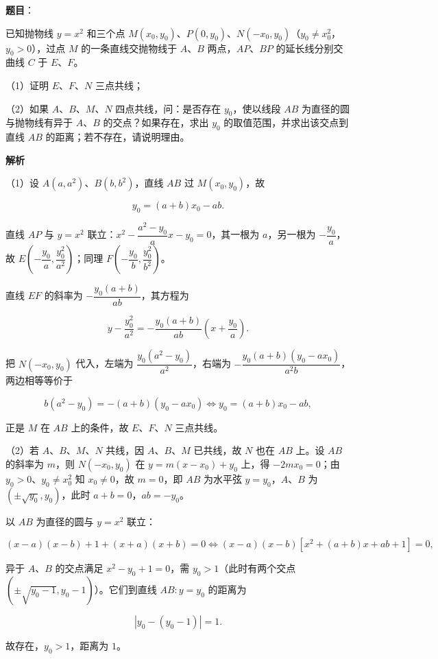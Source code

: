 \begin{answer}

\textbf{题目}：

已知抛物线 $y=x^2$ 和三个点 $M(x_0,y_0)$、$P(0,y_0)$、$N(-x_0,y_0)$（$y_0\neq x_0^2$，$y_0>0$），过点 $M$ 的一条直线交抛物线于 $A$、$B$ 两点，$AP$、$BP$ 的延长线分别交曲线 $C$ 于 $E$、$F$。

（1）证明 $E$、$F$、$N$ 三点共线；

（2）如果 $A$、$B$、$M$、$N$ 四点共线，问：是否存在 $y_0$，使以线段 $AB$ 为直径的圆与抛物线有异于 $A$、$B$ 的交点？如果存在，求出 $y_0$ 的取值范围，并求出该交点到直线 $AB$ 的距离；若不存在，请说明理由。
\nopagebreak[4]
\begin{center}\end{center}
\nopagebreak[4]
\textbf{解析}

（1）设 $A(a,a^2)$、$B(b,b^2)$，直线 $AB$ 过 $M(x_0,y_0)$，故

\nopagebreak[4]
\[y_0=(a+b)x_0-ab.\]

直线 $AP$ 与 $y=x^2$ 联立：$x^2-\dfrac{a^2-y_0}{a}x-y_0=0$，其一根为 $a$，另一根为 $-\dfrac{y_0}a$，故 $E\left(-\dfrac{y_0}a,\dfrac{y_0^2}{a^2}\right)$；同理 $F\left(-\dfrac{y_0}b,\dfrac{y_0^2}{b^2}\right)$。

直线 $EF$ 的斜率为 $-\dfrac{y_0(a+b)}{ab}$，其方程为

\nopagebreak[4]
\[y-\frac{y_0^2}{a^2}=-\frac{y_0(a+b)}{ab}\left(x+\frac{y_0}a\right).\]

把 $N(-x_0,y_0)$ 代入，左端为 $\dfrac{y_0(a^2-y_0)}{a^2}$，右端为 $-\dfrac{y_0(a+b)(y_0-ax_0)}{a^2b}$，两边相等等价于

\nopagebreak[4]
\[b(a^2-y_0)=-(a+b)(y_0-ax_0)\iff y_0=(a+b)x_0-ab,\]

正是 $M$ 在 $AB$ 上的条件，故 $E$、$F$、$N$ 三点共线。

（2）若 $A$、$B$、$M$、$N$ 共线，因 $A$、$B$、$M$ 已共线，故 $N$ 也在 $AB$ 上。设 $AB$ 的斜率为 $m$，则 $N(-x_0,y_0)$ 在 $y=m(x-x_0)+y_0$ 上，得 $-2mx_0=0$；由 $y_0>0$、$y_0\neq x_0^2$ 知 $x_0\neq0$，故 $m=0$，即 $AB$ 为水平弦 $y=y_0$，$A$、$B$ 为 $(\pm\sqrt{y_0},y_0)$，此时 $a+b=0$，$ab=-y_0$。

以 $AB$ 为直径的圆与 $y=x^2$ 联立：

\nopagebreak[4]
\[(x-a)(x-b)+1+(x+a)(x+b)=0\iff(x-a)(x-b)\left[x^2+(a+b)x+ab+1\right]=0,\]

异于 $A$、$B$ 的交点满足 $x^2-y_0+1=0$，需 $y_0>1$（此时有两个交点 $(\pm\sqrt{y_0-1},y_0-1)$）。它们到直线 $AB:y=y_0$ 的距离为

\nopagebreak[4]
\[\left|y_0-(y_0-1)\right|=1.\]

故存在，$y_0>1$，距离为 $1$。


\end{answer}